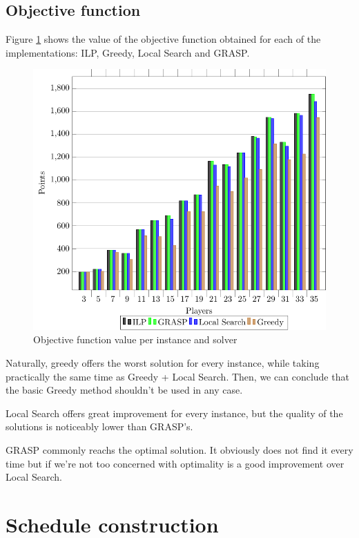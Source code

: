 \documentclass[a4paper, 10pt]{article}
\begin{document}
\clearpage


\clearpage
\subsection{Objective function}

Figure \ref{fig:objfunc} shows the value of the objective function obtained for each of the implementations: ILP, Greedy, Local Search and GRASP. 


\begin{figure}[H]
    \centering
    \includegraphics[width=\linewidth]{plots/solutions.pdf}
    \caption{Objective function value per instance and solver}
    \label{fig:objfunc}
\end{figure}

Naturally, greedy offers the worst solution for every instance, while taking practically the same time as Greedy + Local Search. Then, we can conclude that the basic Greedy method shouldn't be used in any case.

Local Search offers great improvement for every instance, but the quality of the solutions is noticeably lower than GRASP's.

GRASP commonly reachs the optimal solution. It obviously does not find it every time but if we're not too concerned with optimality is a good improvement over Local Search.


\clearpage
\section{Schedule construction}
\label{sec:schedule}
\end{document}
